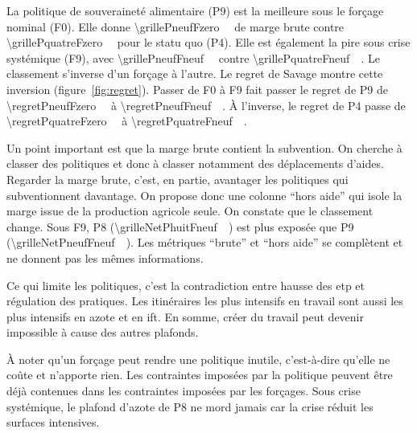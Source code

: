 La politique de souveraineté alimentaire (P9) est la meilleure sous le forçage nominal (F0).
Elle donne \SI{\grillePneufFzero}{\mega\euros} de marge brute contre
\SI{\grillePquatreFzero}{\mega\euros} pour le statu quo (P4). Elle est également la pire sous
crise systémique (F9), avec \SI{\grillePneufFneuf}{\mega\euros} contre
\SI{\grillePquatreFneuf}{\mega\euros}. Le classement s'inverse d'un forçage à l'autre. Le regret
de Savage montre cette inversion (figure~\ref{fig:regret}). Passer de F0 à F9 fait passer le
regret de P9 de \SI{\regretPneufFzero}{\mega\euros} à \SI{\regretPneufFneuf}{\mega\euros}. À
l'inverse, le regret de P4 passe de \SI{\regretPquatreFzero}{\mega\euros} à
\SI{\regretPquatreFneuf}{\mega\euros}.

Un point important est que la marge brute contient la subvention. On cherche à classer des
politiques et donc à classer notamment des déplacements d'aides. Regarder la marge brute, c'est,
en partie, avantager les politiques qui subventionnent davantage. On propose donc une colonne
\enquote{hors aide} qui isole la marge issue de la production agricole seule. On constate que le
classement change. Sous F9, P8 (\SI{\grilleNetPhuitFneuf}{\mega\euros}) est plus exposée que P9
(\SI{\grilleNetPneufFneuf}{\mega\euros}). Les métriques \enquote{brute} et \enquote{hors aide}
se complètent et ne donnent pas les mêmes informations.

Ce qui limite les politiques, c'est la contradiction entre hausse des \gls{etp} et régulation
des pratiques. Les itinéraires les plus intensifs en travail sont aussi les plus intensifs en
azote et en \gls{ift}. En somme, créer du travail peut devenir impossible à cause des autres
plafonds.

À noter qu'un forçage peut rendre une politique inutile, c'est-à-dire qu'elle ne coûte et
n'apporte rien. Les contraintes imposées par la politique peuvent être déjà contenues dans les
contraintes imposées par les forçages. Sous crise systémique, le plafond d'azote de P8 ne mord
jamais car la crise réduit les surfaces intensives.

